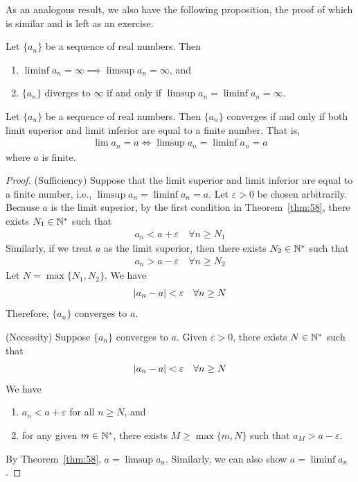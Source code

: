 \documentclass[thmcnt=section, 12pt]{my-elegantbook}
\begin{document}
As an analogous result, we also have the following proposition, the proof of which is similar and is left as an exercise.

\begin{proposition} \label{pro:4}
    Let $\{a_n\}$ be a sequence of real numbers. Then 
    \begin{enumerate}
        \item $\liminf a_n = \infty \implies \limsup a_n = \infty$, and
        \item $\{a_n\}$ diverges to $\infty$ if and only if $\limsup a_n = \liminf a_n = \infty$.
    \end{enumerate}
\end{proposition}


\begin{proposition} \label{pro:5}
    Let $\{a_n\}$ be a sequence of real numbers. Then $\{a_n\}$ converges if and only if both limit superior and limit inferior are equal to a finite number. That is, 
    \begin{align*}
        \lim a_n = a
        \iff
        \limsup a_n = \liminf a_n = a
    \end{align*}
    where $a$ is finite.
\end{proposition}

\begin{proof}
    (Sufficiency) Suppose that the limit superior and limit inferior are equal to a finite number, i.e.,  $\limsup a_n = \liminf a_n = a$. Let $\varepsilon > 0$ be chosen arbitrarily. Because $a$ is the limit superior, by the first condition in Theorem~\ref{thm:58}, there exists $N_1 \in \mathbb{N}^\ast$ such that 
    \begin{align*}
        a_n < a + \varepsilon
        \quad \forall n \geq N_1
    \end{align*}
    Similarly, if we treat $a$ as the limit superior, then there exists $N_2 \in \mathbb{N}^\ast$ such that 
    \begin{align}
        a_n > a - \varepsilon
        \quad \forall n \geq N_2
    \end{align}
    Let $N = \max\{N_1, N_2\}$. We have 
    \begin{align*}
        \left\lvert a_n - a \right\rvert < \varepsilon
        \quad \forall n \geq N
    \end{align*}
    Therefore, $\{a_n\}$ converges to $a$.

    (Necessity) Suppose $\{a_n\}$ converges to $a$. Given $\varepsilon > 0$, there exists $N \in \mathbb{N}^\ast$ such that 
    \begin{align*}
        \left\lvert a_n - a \right\rvert < \varepsilon
        \quad \forall n \geq N
    \end{align*}
    We have 
    \begin{enumerate}
        \item $a_n < a + \varepsilon$ for all $n \geq N$, and 
        \item for any given $m \in \mathbb{N}^\ast$, there exists $M \geq \max\{m, N\}$ such that $a_M > a - \varepsilon$.
    \end{enumerate}
    By Theorem~\ref{thm:58}, $a = \limsup a_n$. Similarly, we can also show $a = \liminf a_n$.
\end{proof}
\end{document}
